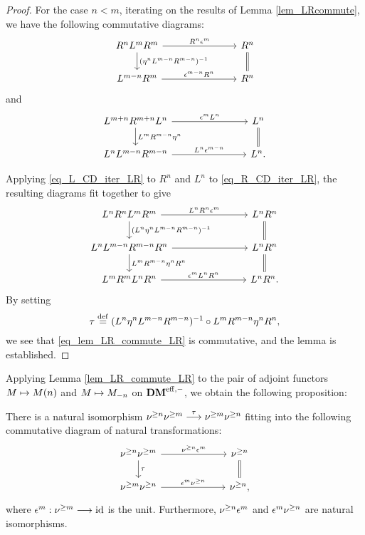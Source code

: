 \begin{proof}
For the case $n < m$, iterating on the results of Lemma 
\ref{lem_LRcommute}, we have the following commutative diagrams: 
\begin{equation}\label{eq_R_CD_iter_LR}
\begin{tikzcd}[column sep=75pt]
R^nL^mR^m \arrow{r}{R^n \cuHI^m}
\arrow{d}{(\eta^nL^{m - n}R^{m - n})^{-1}} &
R^n \arrow[equals]{d} \\
L^{m - n}R^m \arrow{r}{\cuHI^{m - n}R^n} &
R^n 
\end{tikzcd}
\end{equation}
and
\begin{equation}\label{eq_L_CD_iter_LR}
\begin{tikzcd}[column sep=75pt]
L^{m + n}R^{m + n}L^n \arrow{r}{\cuHI^m L^n} 
   \arrow{d}{L^m R^{m - n}\eta^n} &
L^n \arrow[equals]{d} \\
L^nL^{m - n}R^{m - n} \arrow{r}{L^n\cuHI^{m - n}} &
L^n.
\end{tikzcd}
\end{equation}

Applying \eqref{eq_L_CD_iter_LR} to $R^n$ and $L^n$ to 
\eqref{eq_R_CD_iter_LR}, the resulting diagrams fit together to 
give
\[
\begin{tikzcd}[column sep=75pt]
L^nR^n L^mR^m \arrow{r}{L^nR^n \cuHI^m}
\arrow{d}{(L^n\eta^nL^{m - n}R^{m - n})^{-1}} &
L^nR^n \arrow[equals]{d} \\
L^nL^{m - n} R^{m - n}R^n \arrow{r} 
\arrow{d}{L^mR^{m - n}\eta^nR^n}&
L^nR^n \arrow[equals]{d} \\
L^mR^mL^nR^n \arrow{r}{\cuHI^m L^nR^n} &
L^nR^n.
\end{tikzcd}
\]
By setting
\[
\tau \defeq (L^n\eta^nL^{m - n}R^{m - n})^{-1} \comp
   L^mR^{m - n}\eta^nR^n,
\]
we see that \eqref{eq_lem_LR_commute_LR} is commutative, and the 
lemma is established.
\end{proof}

Applying Lemma \ref{lem_LR_commute_LR} to the pair of adjoint
functors $M \mapsto \LHI[n]{M}$ and $M \mapsto \RHI[n]{M}$ on
$\DMeff$, we obtain the following proposition:

\begin{prop}\label{prop_sgn_commute_sgm}
There is a natural isomorphism
$\sgDM{n}\sgDM{m} \stackrel{\tau}{\to} \sgDM{m}\sgDM{n}$
fitting into the following commutative diagram of natural
transformations:
\begin{equation}\label{eq_prop_sg_commute_sg}
\begin{tikzcd}[column sep=65pt]
\sgDM{n} \sgDM{m} \arrow{r}{\sgDM{n}\epsilon^m} \arrow{d}{\tau} 
&\sgDM{n} \arrow[equals]{d} \\
\sgDM{m} \sgDM{n} \arrow{r}{\epsilon^m \sgDM{n}}
&\sgDM{n},
\end{tikzcd}
\end{equation}
where $\epsilon^m : \sgDM{m} \to \id$ is the unit. Furthermore,
$\sgDM{n} \epsilon^m$ and $\epsilon^m \sgDM{n}$ are natural
isomorphisms.
\end{prop}

